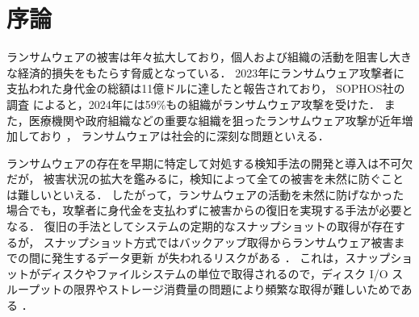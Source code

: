 \chapter{序論}
ランサムウェアの被害は年々拡大しており，個人および組織の活動を阻害し大きな経済的損失をもたらす脅威となっている．
2023年にランサムウェア攻撃者に支払われた身代金の総額は11億ドルに達したと報告されており\cite{Ransomwa86:online}，
SOPHOS社の調査 \cite{sophos-report:online} によると，2024年には59\%もの組織がランサムウェア攻撃を受けた．
また，医療機関や政府組織などの重要な組織を狙ったランサムウェア攻撃が近年増加しており \cite{sophos-report:online}，
ランサムウェアは社会的に深刻な問題といえる．

ランサムウェアの存在を早期に特定して対処する検知手法の開発と導入は不可欠だが，
被害状況の拡大を鑑みるに，検知によって全ての被害を未然に防ぐことは難しいといえる．
したがって，ランサムウェアの活動を未然に防げなかった場合でも，攻撃者に身代金を支払わずに被害からの復旧を実現する手法が必要となる．
復旧の手法としてシステムの定期的なスナップショットの取得が存在するが，
スナップショット方式ではバックアップ取得からランサムウェア被害までの間に発生するデータ更新
が失われるリスクがある \cite{wang2024ransom}．
これは，スナップショットがディスクやファイルシステムの単位で取得されるので，ディスク I/O スループットの限界やストレージ消費量の問題により頻繁な取得が難しいためである \cite{veena2021incremental, wang2024ransom}．

